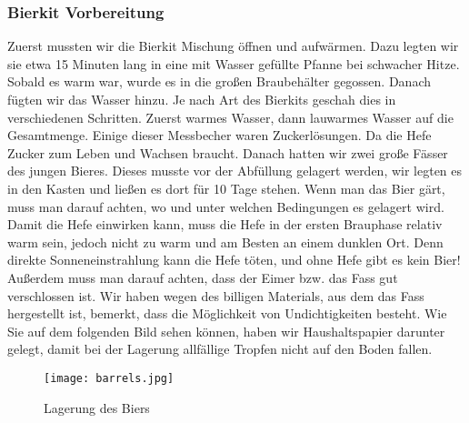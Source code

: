 \subsubsection{Bierkit Vorbereitung}
Zuerst mussten wir die Bierkit Mischung öffnen und aufwärmen. Dazu legten wir
sie etwa 15 Minuten lang in eine mit Wasser gefüllte Pfanne bei schwacher Hitze. Sobald es warm war,
wurde es in die großen Braubehälter gegossen. Danach fügten wir das Wasser hinzu. Je nach Art des Bierkits
geschah dies in verschiedenen Schritten. Zuerst warmes Wasser, dann lauwarmes Wasser auf die Gesamtmenge.
Einige dieser Messbecher waren Zuckerlösungen. Da die Hefe Zucker zum Leben und Wachsen braucht.
Danach hatten wir zwei große Fässer des jungen Bieres.
Dieses musste vor der Abfüllung gelagert werden, wir legten es in den Kasten und ließen es dort für 10 Tage stehen.
Wenn man das Bier gärt, muss man darauf achten, wo und unter welchen Bedingungen es gelagert wird.
Damit die Hefe einwirken kann, muss die Hefe in der ersten Brauphase relativ warm sein, jedoch nicht zu warm und am Besten an einem dunklen Ort. 
Denn direkte Sonneneinstrahlung kann die Hefe töten, und ohne Hefe gibt es kein Bier!
Außerdem muss man darauf achten, dass der Eimer bzw. das Fass gut verschlossen ist. Wir haben wegen des billigen Materials,
aus dem das Fass hergestellt ist, bemerkt, dass die Möglichkeit von Undichtigkeiten besteht. Wie Sie auf dem folgenden Bild sehen können,
haben wir Haushaltspapier darunter gelegt, damit bei der Lagerung allfällige Tropfen nicht auf den Boden fallen. 



\begin{figure}[!h]
	\centering
	\texttt{[image: barrels.jpg]}
	\caption{Lagerung des Biers}
\end{figure}
\newpage

